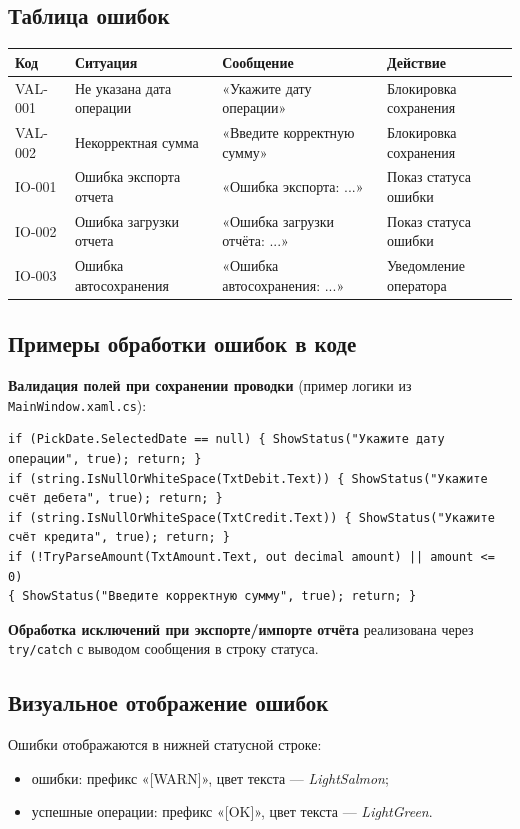 \documentclass[14pt,a4paper]{extarticle}
\begin{document}
\subsection{Таблица ошибок}
\begin{longtable}{|p{2.4cm}|p{5.1cm}|p{4.0cm}|p{3.1cm}|}
\hline
\textbf{Код} & \textbf{Ситуация} & \textbf{Сообщение} & \textbf{Действие} \\
\hline
VAL-001 & Не указана дата операции & «Укажите дату операции» & Блокировка сохранения \\
\hline
VAL-002 & Некорректная сумма & «Введите корректную сумму» & Блокировка сохранения \\
\hline
IO-001 & Ошибка экспорта отчета & «Ошибка экспорта: ...» & Показ статуса ошибки \\
\hline
IO-002 & Ошибка загрузки отчета & «Ошибка загрузки отчёта: ...» & Показ статуса ошибки \\
\hline
IO-003 & Ошибка автосохранения & «Ошибка автосохранения: ...» & Уведомление оператора \\
\hline
\end{longtable}

\subsection{Примеры обработки ошибок в коде}
\textbf{Валидация полей при сохранении проводки} (пример логики из \texttt{MainWindow.xaml.cs}):
\begin{lstlisting}[language={[Sharp]C}]
if (PickDate.SelectedDate == null) { ShowStatus("Укажите дату операции", true); return; }
if (string.IsNullOrWhiteSpace(TxtDebit.Text)) { ShowStatus("Укажите счёт дебета", true); return; }
if (string.IsNullOrWhiteSpace(TxtCredit.Text)) { ShowStatus("Укажите счёт кредита", true); return; }
if (!TryParseAmount(TxtAmount.Text, out decimal amount) || amount <= 0)
{ ShowStatus("Введите корректную сумму", true); return; }
\end{lstlisting}

\textbf{Обработка исключений при экспорте/импорте отчёта} реализована через \texttt{try/catch} с выводом сообщения в строку статуса.

\subsection{Визуальное отображение ошибок}
Ошибки отображаются в нижней статусной строке:
\begin{itemize}
    \item ошибки: префикс «[WARN]», цвет текста --- \textit{LightSalmon};
    \item успешные операции: префикс «[OK]», цвет текста --- \textit{LightGreen}.
\end{itemize}
\end{document}
